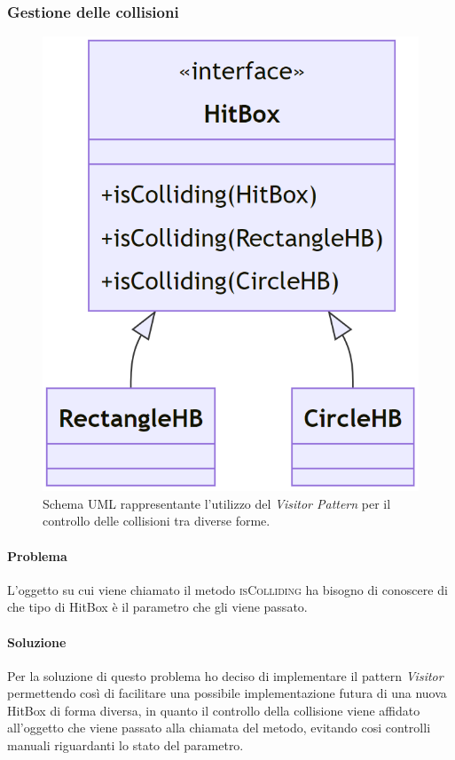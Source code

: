 \documentclass[a4paper,12pt]{report}
\begin{document}
\subsubsection{Gestione delle collisioni}
\begin{figure}[H]
\centering{}
\includegraphics[scale = 0.5]{img/HitBox.PNG}
\caption{Schema UML rappresentante l'utilizzo del \emph{Visitor Pattern} per il controllo delle collisioni tra diverse forme.}
\end{figure}

\paragraph{Problema}
    L'oggetto su cui viene chiamato il metodo \textsc{isColliding} ha bisogno di conoscere di che tipo di HitBox è il parametro 
    che gli viene passato.
\paragraph{Soluzione}
    Per la soluzione di questo problema ho deciso di implementare il pattern \emph{Visitor} permettendo così di facilitare una possibile 
    implementazione futura di una nuova HitBox di forma diversa, in quanto il controllo della collisione viene affidato all'oggetto 
    che viene passato alla chiamata del metodo, evitando cosi controlli manuali riguardanti lo stato del parametro.
\end{document}
